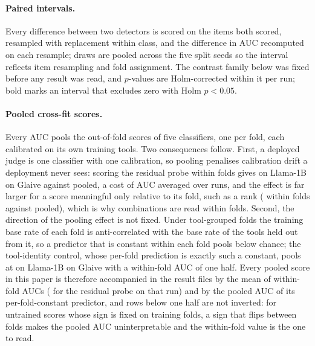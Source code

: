 \paragraph{Paired intervals.}
Every difference between two detectors is scored on the items both scored, resampled with replacement within
class, and the difference in AUC recomputed on each resample; draws are pooled across the five split seeds so
the interval reflects item resampling and fold assignment. The contrast family below was fixed before any
result was read, and $p$-values are Holm-corrected within it per run; bold marks an interval that excludes zero
with Holm $p<0.05$.
\begin{center}
\scriptsize

\end{center}
\label{tab:paired}

\paragraph{Pooled cross-fit scores.}
Every AUC pools the out-of-fold scores of five classifiers, one per fold, each calibrated on its own training
tools. Two consequences follow. First, a deployed judge is one classifier with one calibration, so pooling
penalises calibration drift a deployment never sees: scoring the residual probe within folds gives
\poolWithinHiddenLlamaOneBGlaive{} on Llama-1B on Glaive against \poolPooledHiddenLlamaOneBGlaive{} pooled, a
cost of \poolCostHiddenMean{} AUC averaged over \poolNRuns{} runs, and the effect is far larger for a score
meaningful only relative to its fold, such as a rank (\poolWithinRankMeanLlamaOneBGlaive{} within folds against
\poolPooledRankMeanLlamaOneBGlaive{} pooled), which is why combinations are read within folds. Second, the
direction of the pooling effect is not fixed. Under tool-grouped folds the training base rate of each fold is
anti-correlated with the base rate of the tools held out from it, so a predictor that is constant within
each fold pools below chance; the tool-identity control, whose per-fold prediction is exactly such a
constant, pools at \foldOffsetToolOneHotBaseLlamaOneBGlaive{} on Llama-1B on Glaive with a within-fold AUC of
one half. Every pooled score in this paper is therefore accompanied in the result files by the mean of
within-fold AUCs (\aucFmHiddenLRBaseLlamaOneBGlaiveSem{} for the residual probe on that run) and by the pooled
AUC of its per-fold-constant predictor, and rows below one half are not inverted: for untrained scores whose
sign is fixed on training folds, a sign that flips between folds makes the pooled AUC uninterpretable and the
within-fold value is the one to read.

